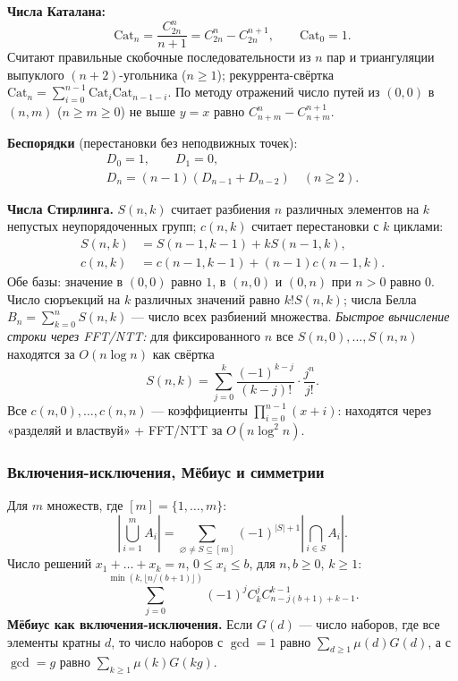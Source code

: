 \textbf{Числа Каталана:}
\[
  \mathrm{Cat}_n=\frac{C_{2n}^{n}}{n+1}
    =C_{2n}^{n}-C_{2n}^{n+1},\qquad \mathrm{Cat}_0=1.
\]
Считают правильные скобочные последовательности из $n$ пар и триангуляции выпуклого $(n+2)$-угольника ($n\ge1$); рекуррента-свёртка $\mathrm{Cat}_n=\sum_{i=0}^{n-1}\mathrm{Cat}_i\mathrm{Cat}_{n-1-i}$. По методу отражений число путей из $(0,0)$ в $(n,m)$ ($n\ge m\ge0$) не выше $y=x$ равно $C_{n+m}^n-C_{n+m}^{n+1}$.

\textbf{Беспорядки} (перестановки без неподвижных точек):
\[
  \begin{gathered}
    D_0=1,\qquad D_1=0,\\
    D_n=(n-1)(D_{n-1}+D_{n-2})\quad(n\ge2).
  \end{gathered}
\]

\textbf{Числа Стирлинга.} $S(n,k)$ считает разбиения $n$ различных элементов на $k$ непустых неупорядоченных групп; $c(n,k)$ считает перестановки с $k$ циклами:
\[
  \begin{aligned}
    S(n,k)&=S(n-1,k-1)+kS(n-1,k),\\
    c(n,k)&=c(n-1,k-1)+(n-1)c(n-1,k).
  \end{aligned}
\]
Обе базы: значение в $(0,0)$ равно $1$, в $(n,0)$ и $(0,n)$ при $n>0$ равно $0$. Число сюръекций на $k$ различных значений равно $k!S(n,k)$; числа Белла $B_n=\sum_{k=0}^n S(n,k)$ --- число всех разбиений множества.
\emph{Быстрое вычисление строки через FFT/NTT:} для фиксированного $n$ все $S(n,0),\dots,S(n,n)$ находятся за $O(n\log n)$ как свёртка
\[
  S(n,k)=\sum_{j=0}^{k}\frac{(-1)^{k-j}}{(k-j)!}\cdot\frac{j^n}{j!}.
\]
Все $c(n,0),\dots,c(n,n)$ --- коэффициенты $\prod_{i=0}^{n-1}(x+i)$: находятся через «разделяй и властвуй» + FFT/NTT за $O(n\log^2 n)$.

\subsubsection*{Включения-исключения, Мёбиус и симметрии}
Для $m$ множеств, где $[m]=\{1,\dots,m\}$:
\[
  \left|\bigcup_{i=1}^{m} A_i\right|
  =\sum_{\varnothing\ne S\subseteq[m]}
    (-1)^{|S|+1}\left|\bigcap_{i\in S}A_i\right|.
\]
Число решений $x_1+\dots+x_k=n$, $0\le x_i\le b$, для $n,b\ge0$, $k\ge1$:
\[
  \sum_{j=0}^{\min(k,\lfloor n/(b+1)\rfloor)}
    (-1)^j C_k^j C_{n-j(b+1)+k-1}^{k-1}.
\]
\textbf{Мёбиус как включения-исключения.} Если $G(d)$ --- число наборов, где все элементы кратны $d$, то число наборов с $\gcd=1$ равно $\sum_{d\ge1}\mu(d)G(d)$, а с $\gcd=g$ равно $\sum_{k\ge1}\mu(k)G(kg)$.


